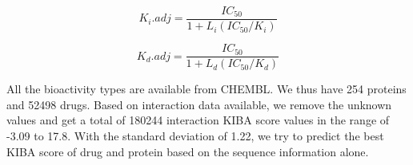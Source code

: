 \begin{equation}
K_i.{adj} = \frac{IC_{50}}{1 + L_i(IC_{50}/K_i)}
\label{eq:ki_adj}
\end{equation}

\begin{equation}
K_d.{adj} = \frac{IC_{50}}{1 + L_d(IC_{50}/K_d)}
\end{equation}

All the bioactivity types are available from CHEMBL\cite{Gaulton2017}. We thus have 254 proteins and 52498 drugs. Based on interaction data available, we remove the unknown values and get a total of 180244 interaction KIBA score values in the range of -3.09 to 17.8. With the standard deviation of 1.22, we try to predict the best KIBA score of drug and protein based on the sequence information alone.
\begin{figure}
  \centering 

\end{figure}
